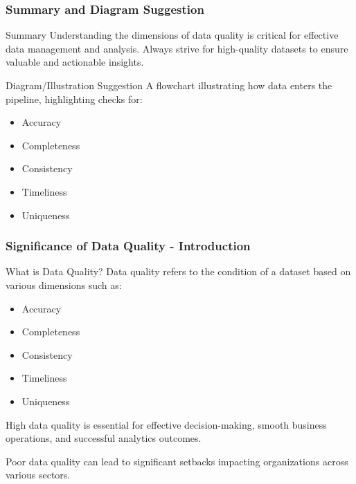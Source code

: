 \documentclass[aspectratio=169]{beamer}
\begin{document}
\begin{frame}[fragile]
    \frametitle{Summary and Diagram Suggestion}
    \begin{block}{Summary}
        Understanding the dimensions of data quality is critical for effective data management and analysis. Always strive for high-quality datasets to ensure valuable and actionable insights.
    \end{block}
    \begin{block}{Diagram/Illustration Suggestion}
        A flowchart illustrating how data enters the pipeline, highlighting checks for:
        \begin{itemize}
            \item Accuracy
            \item Completeness
            \item Consistency
            \item Timeliness
            \item Uniqueness
        \end{itemize}
    \end{block}
\end{frame}

\begin{frame}[fragile]
    \frametitle{Significance of Data Quality - Introduction}
    \begin{block}{What is Data Quality?}
        Data quality refers to the condition of a dataset based on various dimensions such as:
        \begin{itemize}
            \item Accuracy
            \item Completeness
            \item Consistency
            \item Timeliness
            \item Uniqueness
        \end{itemize}
        High data quality is essential for effective decision-making, smooth business operations, and successful analytics outcomes.
    \end{block}
    Poor data quality can lead to significant setbacks impacting organizations across various sectors.
\end{frame}
\end{document}
